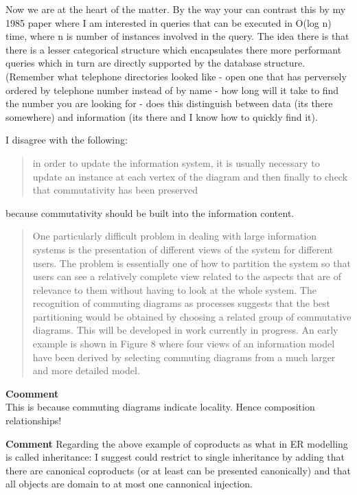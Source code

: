 \documentclass[11pt,a4paper]{scrartcl}
\begin{document}
Now we are at the heart of the matter. By the way your can contrast this by my 1985 paper where I am interested in queries that can
be executed in O(log n) time, where n is number of instances involved in the query. The idea there is that there is a lesser
categorical structure which encapsulates there more performant queries which in turn are directly supported by the database structure.
(Remember what telephone directories looked like - open one that has perversely ordered by telephone number instead of by name -
how long will it take to find the number you are looking for - does this distinguish between data (its there somewhere) and information
(its there and I know how to quickly find it).  


I disagree with the following:
\begin{quote}
in order to update the information system, it is usually necessary to
update an instance at each vertex of the diagram and then finally to check that
commutativity has been preserved
\end{quote}
because commutativity should be built into the information content.

\begin{quote}
One particularly difficult problem in dealing with large information systems
is the presentation of different views of the system for different users. The
problem is essentially one of how to partition the system so that users can see
a relatively complete view related to the aspects that are of relevance to them
without having to look at the whole system. The recognition of commuting
diagrams as processes suggests that the best partitioning would be obtained
by choosing a related group of commutative diagrams. This will be developed
in work currently in progress. An early example is shown in Figure 8 where
four views of an information model have been derived by selecting commuting
diagrams from a much larger and more detailed model.
\end{quote}
\textbf{Coomment}\\

This is because commuting diagrams indicate locality. Hence composition relationships!

\textbf{Comment}
Regarding the above example of coproducts as what in ER modelling is called inheritance: I suggest could restrict to single inheritance by adding that
there are canonical coproducts (or at least can be presented canonically) and that all objects are domain to at most
one cannonical injection. 
\end{document}
